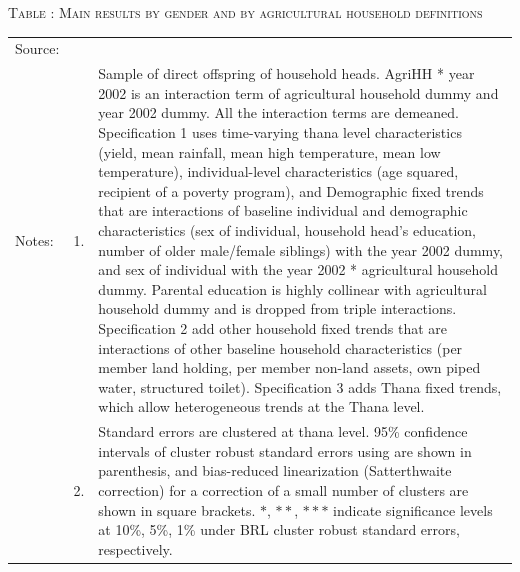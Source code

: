 \documentclass[12pt,letterpaper]{article}
\newcommand{\0}{\ensuremath{\mbox{\boldmath $0$}}}
\begin{document}
{\begin{table}
\hfil\textsc{\footnotesize Table \thetable: Main results by gender and by agricultural household definitions\label{MainGenderByAgdefResults}}\\
\setlength{\tabcolsep}{1pt}
\renewcommand{\arraystretch}{.75}
\hspace{-1.0cm}
\renewcommand{\arraystretch}{1}
\hfil\begin{tabular}{>{\hfill\scriptsize}p{1cm}<{}>{\hfill\scriptsize}p{.25cm}<{}>{\scriptsize}p{.7\paperwidth}<{\hfill}}
Source:& \multicolumn{2}{l}{\scriptsize Compiled from IFPRI data. }\\[-1ex]
Notes:& 1. & Sample of direct offspring of household heads. \textsf{AgriHH * year 2002} is an interaction term of agricultural household dummy and year 2002 dummy. All the interaction terms are demeaned. Specification 1 uses time-varying thana level characteristics (yield, mean rainfall, mean high temperature, mean low temperature), individual-level characteristics (age squared, recipient of a poverty program), and \textsf{Demographic fixed trends} that are interactions of baseline individual and demographic characteristics (sex of individual, household head's education, number of older male/female siblings) with the year 2002 dummy, and sex of individual with the year 2002 * agricultural household dummy. Parental education is highly collinear with agricultural household dummy and is dropped from triple interactions. Specification 2 add \textsf{other household fixed trends} that are interactions of other baseline household characteristics (per member land holding, per member non-land assets, own piped water, structured toilet). Specification 3 adds \textsf{Thana fixed trends}, which allow heterogeneous trends at the Thana level. \\[-1ex]
& 2. & Standard errors are clustered at thana level. 95\% confidence intervals of cluster robust standard errors using \cite{liang1986longitudinal} are shown in parenthesis, and bias-reduced linearization (Satterthwaite correction) for a correction of a small number of clusters are shown in square brackets. $*$, $**$, $***$ indicate significance levels at 10\%, 5\%, 1\% under BRL cluster robust standard errors, respectively.\end{tabular}
\end{table}


}
\end{document}
